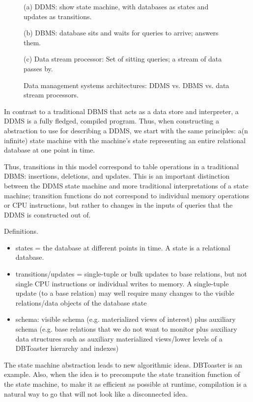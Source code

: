 \begin{figure}
(a) DDMS: show state machine, with databases as states and updates as transitions.

(b) DBMS: database sits and waits for queries to arrive; answers them.

(c) Data stream processor: Set of sitting queries; a stream of data passes by.

\caption{Data management systems architectures: DDMS vs. DBMS vs. data stream processors.}
\end{figure}

In contrast to a traditional DBMS that acts as a data store and interpreter, a DDMS is a fully fledged, compiled program.  Thus, when constructing a abstraction to use for describing a DDMS, we start with the same principles: a(n infinite) state machine with the machine's state representing an entire relational database at one point in time.

Thus, transitions in this model correspond to table operations in a traditional DBMS: insertions, deletions, and updates.  This is an important distinction between the DDMS state machine and more traditional interpretations of a state machine; transition functions do not correspond to individual memory operations or CPU instructions, but rather to changes in the inputs of queries that the DDMS is constructed out of.





Definitions.
\begin{itemize}
\item
states = the database at different points in time. A state is a relational database.

\item
transitions/updates = single-tuple or bulk updates to base relations, but not single CPU instructions or individual writes to memory. A single-tuple update (to a base relation) may well require many changes to the visible relations/data objects of the database state

\item
schema: visible schema (e.g. materialized views of interest) plus auxiliary schema (e.g. base relations that we do not want to monitor plus auxiliary data structures such as auxiliary materialized views/lower levels of a DBToaster hierarchy and indexes)
\end{itemize}


The state machine abstraction leads to new algorithmic ideas. DBToaster is an example. Also, when the idea is to precompute the state transition function of the state machine, to make it as efficient as possible at runtime, compilation is a natural way to go that will not look like a disconnected idea.



